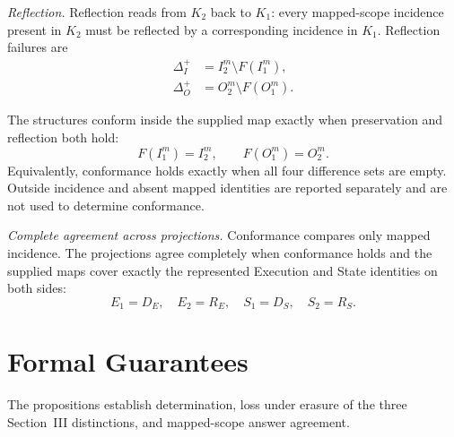 \documentclass[conference]{IEEEtran}
\theoremstyle{tideproposition}
\begin{document}
\emph{Reflection.}
Reflection reads from $K_2$ back to $K_1$: every mapped-scope incidence present in $K_2$ must be reflected by a corresponding incidence in $K_1$. Reflection failures are
\begin{align}
\Delta_I^+&=I_2^m\setminus F(I_1^m),\\
\Delta_O^+&=O_2^m\setminus F(O_1^m).
\label{eq:reflection-deltas}
\end{align}

The structures conform inside the supplied map exactly when preservation and reflection both hold:
\begin{equation}
F(I_1^m)=I_2^m,
\qquad
F(O_1^m)=O_2^m.
\label{eq:scoped-conformance}
\end{equation}
Equivalently, conformance holds exactly when all four difference sets are empty. Outside incidence and absent mapped identities are reported separately and are not used to determine conformance.

\emph{Complete agreement across projections.}
Conformance compares only mapped incidence. The projections agree completely when conformance holds and the supplied maps cover exactly the represented Execution and State identities on both sides:
\begin{equation}
E_1=D_E,\quad E_2=R_E,\quad
S_1=D_S,\quad S_2=R_S.
\label{eq:projection-coverage}
\end{equation}

\section{Formal Guarantees}
The propositions establish determination, loss under erasure of the three Section~III distinctions, and mapped-scope answer agreement.
\end{document}
